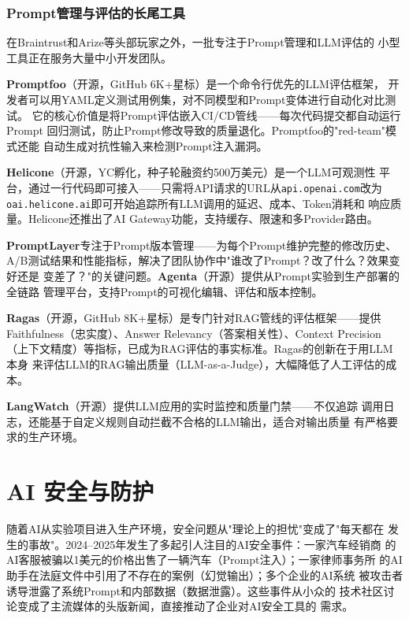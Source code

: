 \subsubsection{Prompt管理与评估的长尾工具}
在Braintrust和Arize等头部玩家之外，一批专注于Prompt管理和LLM评估的
小型工具正在服务大量中小开发团队。

\textbf{Promptfoo}（开源，GitHub 6K+星标）是一个命令行优先的LLM评估框架，
开发者可以用YAML定义测试用例集，对不同模型和Prompt变体进行自动化对比测试。
它的核心价值是将Prompt评估嵌入CI/CD管线——每次代码提交都自动运行Prompt
回归测试，防止Prompt修改导致的质量退化。Promptfoo的"red-team"模式还能
自动生成对抗性输入来检测Prompt注入漏洞。

\textbf{Helicone}（开源，YC孵化，种子轮融资约500万美元）是一个LLM可观测性
平台，通过一行代码即可接入——只需将API请求的URL从\texttt{api.openai.com}改为
\texttt{oai.helicone.ai}即可开始追踪所有LLM调用的延迟、成本、Token消耗和
响应质量。Helicone还推出了AI Gateway功能，支持缓存、限速和多Provider路由。

\textbf{PromptLayer}专注于Prompt版本管理——为每个Prompt维护完整的修改历史、
A/B测试结果和性能指标，解决了团队协作中"谁改了Prompt？改了什么？效果变好还是
变差了？"的关键问题。\textbf{Agenta}（开源）提供从Prompt实验到生产部署的全链路
管理平台，支持Prompt的可视化编辑、评估和版本控制。

\textbf{Ragas}（开源，GitHub 8K+星标）是专门针对RAG管线的评估框架——提供
Faithfulness（忠实度）、Answer Relevancy（答案相关性）、Context Precision
（上下文精度）等指标，已成为RAG评估的事实标准。Ragas的创新在于用LLM本身
来评估LLM的RAG输出质量（LLM-as-a-Judge），大幅降低了人工评估的成本。

\textbf{LangWatch}（开源）提供LLM应用的实时监控和质量门禁——不仅追踪
调用日志，还能基于自定义规则自动拦截不合格的LLM输出，适合对输出质量
有严格要求的生产环境。


\section{AI 安全与防护}
\label{sec:platform-security}

随着AI从实验项目进入生产环境，安全问题从"理论上的担忧"变成了"每天都在
发生的事故"。2024--2025年发生了多起引人注目的AI安全事件：一家汽车经销商
的AI客服被骗以1美元的价格出售了一辆汽车（Prompt注入）；一家律师事务所
的AI助手在法庭文件中引用了不存在的案例（幻觉输出）；多个企业的AI系统
被攻击者诱导泄露了系统Prompt和内部数据（数据泄露）。这些事件从小众的
技术社区讨论变成了主流媒体的头版新闻，直接推动了企业对AI安全工具的
需求。

